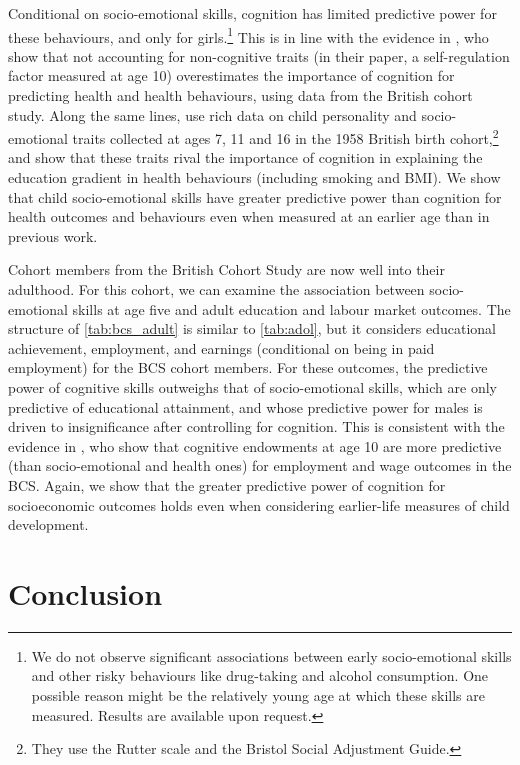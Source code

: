 Conditional on socio-emotional skills, cognition has limited predictive power for these behaviours, and only for girls.\footnote{We do not observe significant associations between early socio-emotional skills and other risky behaviours like drug-taking and alcohol consumption. One possible reason might be the relatively young age at which these skills are measured. Results are available upon request.} This is in line with the evidence in \citet{Conti2010}, who show that not accounting for non-cognitive traits (in their paper, a self-regulation factor measured at age 10) overestimates the importance of cognition for predicting health and health behaviours, using data from the British cohort study. Along the same lines, \citet{Conti2013a} use rich data on child personality and socio-emotional traits collected at ages 7, 11 and 16 in the 1958 British birth cohort,\footnote{They use the Rutter scale and the Bristol Social Adjustment Guide.} and show that these traits rival the importance of cognition in explaining the education gradient in health behaviours (including smoking and BMI). We show that child socio-emotional skills have greater predictive power than cognition for health outcomes and behaviours even when measured at an earlier age than in previous work.

Cohort members from the British Cohort Study are now well into their adulthood. For this cohort, we can examine the association between socio-emotional skills at age five and adult education and labour market outcomes. The structure of \autoref{tab:bcs_adult} is similar to \autoref{tab:adol}, but it considers educational achievement, employment, and earnings (conditional on being in paid employment) for the BCS cohort members. For these outcomes, the predictive power of cognitive skills outweighs that of socio-emotional skills, which are only predictive of educational attainment, and whose predictive power for males is driven to insignificance after controlling for cognition. This is consistent with the evidence in  \citet{Conti2011}, who show that cognitive endowments at age 10 are more predictive (than socio-emotional and health ones) for employment and wage outcomes in the BCS. Again, we show that the greater predictive power of cognition for socioeconomic outcomes holds even when considering earlier-life measures of child development.

\section{Conclusion}\label{sec:conclusions}

